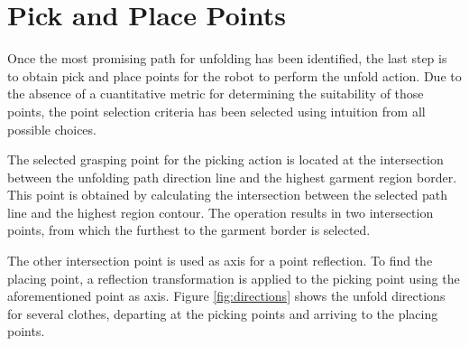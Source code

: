 \section{Pick and Place Points}
\label{pnp:pick_and_place}
Once the most promising path for unfolding has been identified, the last step is to obtain pick and place points for the robot to perform the unfold action. Due to the absence of a cuantitative metric for determining the suitability of those points, the point selection criteria has been selected using intuition from all possible choices.

The selected grasping point for the picking action is located at the intersection between the unfolding path direction line and the highest garment region border. This point is obtained by calculating the intersection between the selected path line and the highest region contour. The operation results in two intersection points, from which the furthest to the garment border is selected.

The other intersection point is used as axis for a point reflection. To find the placing point, a reflection transformation is applied to the picking point using the aforementioned point as axis. Figure \ref{fig:directions} shows the unfold directions for several clothes, departing at the picking points and arriving to the placing points.


